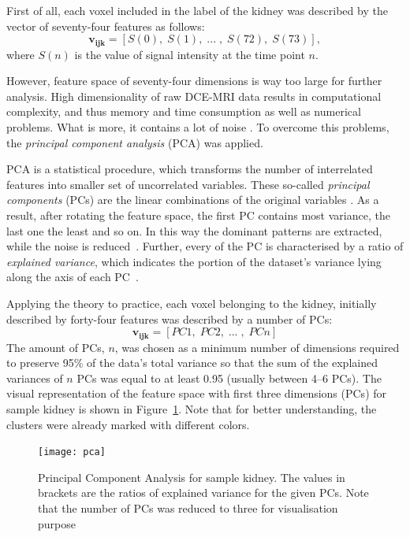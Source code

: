 First of all, each voxel included in the label of the kidney was described by the vector of seventy-four features as follows:
\begin{equation}
\label{eq:voxel}
\mathbf{v_{ijk}} = [S(0),\; S(1),\;...\;,\; S(72),\; S(73)],
\end{equation}
where $S(n)$ is the value of signal intensity at the time point $n$.
\newpage

However, feature space of seventy-four dimensions is way too large for further analysis. High dimensionality of raw DCE-MRI data results in computational complexity, and thus memory and time consumption as well as numerical problems. What is more, it contains a lot of noise \cite{KidneySubsegmentation}. To overcome this problems, the \textit{principal component analysis} (PCA) \cite{pca} was applied.

PCA is a statistical procedure, which transforms the number of interrelated features into smaller set of uncorrelated variables. These so-called \textit{principal components} (PCs) are the linear combinations of the original variables \cite{dunteman1989principal}. As a result, after rotating the feature space, the first PC contains most variance, the last one the least and so on. In this way the dominant patterns are extracted, while the noise is reduced~\cite{pca, jolliffe1986principal}. Further, every of the PC is characterised by a ratio of \textit{explained variance}, which indicates the portion of the dataset’s variance lying along the axis of each PC~\cite{handson}.

Applying the theory to practice, each voxel belonging to the kidney, initially described by forty-four features was described by a number of PCs:
\begin{equation}
\label{eq:voxelpca}
\mathbf{v_{ijk}} = [PC1,\; PC2,\;...\;,\; PCn]  
\end{equation}
The amount of PCs, $n$, was chosen as a minimum number of dimensions required to preserve 95\% of the data's total variance so that the sum of the explained variances of  $n$ PCs was equal to at least 0.95 (usually between 4--6 PCs). The visual representation of the feature space with first three dimensions (PCs) for sample kidney is shown in Figure~\ref{fig:pca_plot}. Note that for better understanding, the clusters were already marked with different colors. 

\begin{figure}[H]
		\centering
		\texttt{[image: pca]}
		\caption [Principal Component Analysis for a sample kidney]{Principal Component Analysis for sample kidney. The values in brackets are the ratios of explained variance for the given PCs. Note that the number of PCs was reduced to three for visualisation purpose}
		\label{fig:pca_plot}
	\end{figure}

